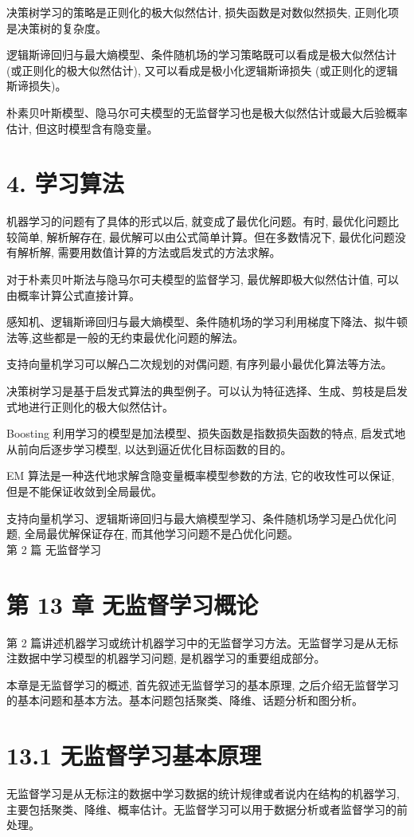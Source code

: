 \documentclass[10pt]{article}
\begin{document}
\begin{CJK*}{UTF8}{bsmi}
决策树学习的策略是正则化的极大似然估计, 损失函数是对数似然损失, 正则化项是决策树的复杂度。

逻辑斯谛回归与最大熵模型、条件随机场的学习策略既可以看成是极大似然估计 (或正则化的极大似然估计), 又可以看成是极小化逻辑斯谛损失 (或正则化的逻辑斯谛损失)。

朴素贝叶斯模型、隐马尔可夫模型的无监督学习也是极大似然估计或最大后验概率估计, 但这时模型含有隐变量。

\section*{4. 学习算法}
机器学习的问题有了具体的形式以后, 就变成了最优化问题。有时, 最优化问题比较简单, 解析解存在, 最优解可以由公式简单计算。但在多数情况下, 最优化问题没有解析解, 需要用数值计算的方法或启发式的方法求解。

对于朴素贝叶斯法与隐马尔可夫模型的监督学习, 最优解即极大似然估计值, 可以由概率计算公式直接计算。

感知机、逻辑斯谛回归与最大熵模型、条件随机场的学习利用梯度下降法、拟牛顿法等,这些都是一般的无约束最优化问题的解法。

支持向量机学习可以解凸二次规划的对偶问题, 有序列最小最优化算法等方法。

决策树学习是基于启发式算法的典型例子。可以认为特征选择、生成、剪枝是启发式地进行正则化的极大似然估计。

Boosting 利用学习的模型是加法模型、损失函数是指数损失函数的特点, 启发式地从前向后逐步学习模型, 以达到逼近优化目标函数的目的。

EM 算法是一种迭代地求解含隐变量概率模型参数的方法, 它的收玫性可以保证, 但是不能保证收敛到全局最优。

支持向量机学习、逻辑斯谛回归与最大熵模型学习、条件随机场学习是凸优化问题, 全局最优解保证存在, 而其他学习问题不是凸优化问题。\\
第 2 篇 无监督学习

\section*{第 13 章 无监督学习概论}
第 2 篇讲述机器学习或统计机器学习中的无监督学习方法。无监督学习是从无标注数据中学习模型的机器学习问题, 是机器学习的重要组成部分。

本章是无监督学习的概述, 首先叙述无监督学习的基本原理, 之后介绍无监督学习的基本问题和基本方法。基本问题包括聚类、降维、话题分析和图分析。

\section*{13.1 无监督学习基本原理}
无监督学习是从无标注的数据中学习数据的统计规律或者说内在结构的机器学习, 主要包括聚类、降维、概率估计。无监督学习可以用于数据分析或者监督学习的前处理。


\end{CJK*}
\end{document}

